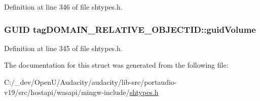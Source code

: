 Definition at line 346 of file shtypes.\+h.

\subsubsection[{\texorpdfstring{guid\+Volume}{guidVolume}}]{\setlength{\rightskip}{0pt plus 5cm}G\+U\+ID tag\+D\+O\+M\+A\+I\+N\+\_\+\+R\+E\+L\+A\+T\+I\+V\+E\+\_\+\+O\+B\+J\+E\+C\+T\+I\+D\+::guid\+Volume}\hypertarget{structtag_d_o_m_a_i_n___r_e_l_a_t_i_v_e___o_b_j_e_c_t_i_d_a1d9c9ff43609cdf1b4d602c22bc9ced3}{}\label{structtag_d_o_m_a_i_n___r_e_l_a_t_i_v_e___o_b_j_e_c_t_i_d_a1d9c9ff43609cdf1b4d602c22bc9ced3}


Definition at line 345 of file shtypes.\+h.



The documentation for this struct was generated from the following file\+:\begin{DoxyCompactItemize}
\item 
C\+:/\+\_\+dev/\+Open\+U/\+Audacity/audacity/lib-\/src/portaudio-\/v19/src/hostapi/wasapi/mingw-\/include/\hyperlink{shtypes_8h}{shtypes.\+h}\end{DoxyCompactItemize}
